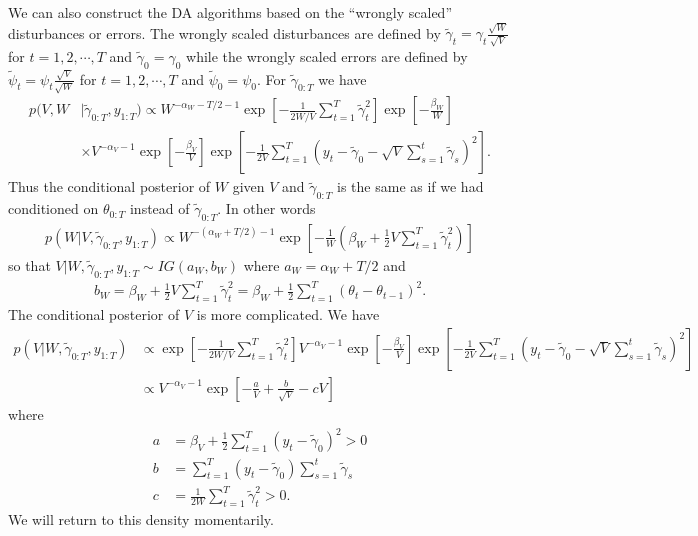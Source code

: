 \documentclass{article}
\begin{document}
We can also construct the DA algorithms based on the ``wrongly scaled'' disturbances or errors. The wrongly scaled disturbances are defined by $\tilde{\gamma}_t = \gamma_t\frac{\sqrt{W}}{\sqrt{V}}$ for $t=1,2,\cdots,T$ and $\tilde{\gamma}_0=\gamma_0$ while the wrongly scaled errors are defined by $\tilde{\psi}_t = \psi_t\frac{\sqrt{V}}{\sqrt{W}}$ for $t=1,2,\cdots,T$ and $\tilde{\psi}_0=\psi_0$. For $\tilde{\gamma}_{0:T}$ we have
\begin{align}
  p(V,W&|\tilde{\gamma}_{0:T},y_{1:T}) \propto W^{-\alpha_W - T/2 - 1}\exp\left[-\frac{1}{2W/V}\sum_{t=1}^T\tilde{\gamma}_t^2\right]\exp\left[-\frac{\beta_W}{W}\right]\nonumber\\
  &\times V^{-\alpha_V-1}\exp\left[-\frac{\beta_V}{V}\right]\exp\left[-\frac{1}{2V}\sum_{t=1}^T\left(y_t - \tilde{\gamma}_0 - \sqrt{V}\sum_{s=1}^t\tilde{\gamma}_s\right)^2\right].\label{llmwdistpost}
\end{align}
Thus the conditional posterior of $W$ given $V$ and $\tilde{\gamma}_{0:T}$ is the same as if we had conditioned on $\theta_{0:T}$ instead of $\tilde{\gamma}_{0:T}$. In other words
\begin{align*}
  p(W|V,\tilde{\gamma}_{0:T},y_{1:T}) \propto W^{-(\alpha_W + T/2) - 1}\exp\left[-\frac{1}{W}\left(\beta_W + \frac{1}{2}V\sum_{t=1}^T\tilde{\gamma}_t^2\right)\right]
\end{align*}
so that $V|W,\tilde{\gamma}_{0:T},y_{1:T}\sim IG(a_W, b_W)$ where $a_W = \alpha_W + T/2$ and 
\begin{align*}
  b_W = \beta_W + \frac{1}{2}V\sum_{t=1}^T\tilde{\gamma}_t^2 = \beta_W + \frac{1}{2}\sum_{t=1}^T(\theta_t - \theta_{t-1})^2.
\end{align*}
The conditional posterior of $V$ is more complicated. We have
\begin{align*}
  p(V|W,\tilde{\gamma}_{0:T},y_{1:T}) &\propto \exp\left[-\frac{1}{2W/V}\sum_{t=1}^T\tilde{\gamma}_t^2\right] V^{-\alpha_V-1}\exp\left[-\frac{\beta_V}{V}\right]\exp\left[-\frac{1}{2V}\sum_{t=1}^T\left(y_t - \tilde{\gamma}_0 - \sqrt{V}\sum_{s=1}^t\tilde{\gamma}_s\right)^2\right]\\
  &\propto V^{-\alpha_V - 1}\exp\left[-\frac{a}{V} + \frac{b}{\sqrt{V}} - cV\right]
\end{align*}
where 
\begin{align*}
  a & = \beta_V + \frac{1}{2}\sum_{t=1}^T(y_t - \tilde{\gamma}_0)^2 > 0\\
  b & = \sum_{t=1}^T(y_t - \tilde{\gamma}_0)\sum_{s=1}^t\tilde{\gamma}_s\\
  c & = \frac{1}{2W}\sum_{t=1}^T\tilde{\gamma}_t^2 > 0.
\end{align*}
We will return to this density momentarily.
\end{document}
